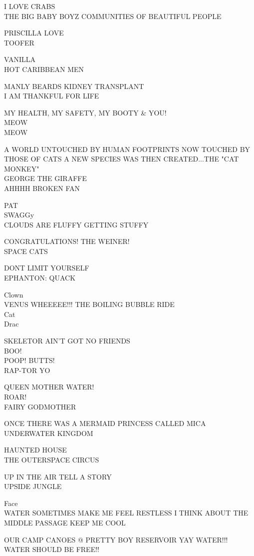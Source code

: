\documentclass[10pt,letterpaper]{article}
\begin{document}
I LOVE CRABS\\
THE BIG BABY BOYZ COMMUNITIES OF BEAUTIFUL PEOPLE

PRISCILLA LOVE\\
TOOFER

VANILLA\\
HOT CARIBBEAN MEN

MANLY BEARDS KIDNEY TRANSPLANT\\
I AM THANKFUL FOR LIFE

MY HEALTH, MY SAFETY, MY BOOTY \& YOU!\\
MEOW\\
MEOW

A WORLD UNTOUCHED BY HUMAN FOOTPRINTS NOW TOUCHED BY THOSE OF CATS A NEW SPECIES WAS THEN CREATED...THE "CAT MONKEY"\\
GEORGE THE GIRAFFE\\
AHHHH BROKEN FAN

PAT\\
SWAGGy\\
CLOUDS ARE FLUFFY GETTING STUFFY

CONGRATULATIONS!  THE WEINER!\\
SPACE CATS

DONT LIMIT YOURSELF\\
EPHANTON: QUACK

Clown\\
VENUS WHEEEEE!!! THE BOILING BUBBLE RIDE\\
Cat\\
Drac

SKELETOR AIN'T GOT NO FRIENDS\\
BOO!\\
POOP!  BUTTS!\\
RAP{-}TOR YO

QUEEN MOTHER WATER!\\
ROAR!\\
FAIRY GODMOTHER

ONCE THERE WAS A MERMAID PRINCESS CALLED MICA\\
UNDERWATER KINGDOM

HAUNTED HOUSE\\
THE OUTERSPACE CIRCUS

UP IN THE AIR TELL A STORY\\
UPSIDE JUNGLE

Face\\
WATER SOMETIMES MAKE ME FEEL RESTLESS I THINK ABOUT THE MIDDLE PASSAGE KEEP ME COOL

OUR CAMP CANOES @ PRETTY BOY RESERVOIR YAY WATER!!!\\
WATER SHOULD BE FREE!!
\end{document}
